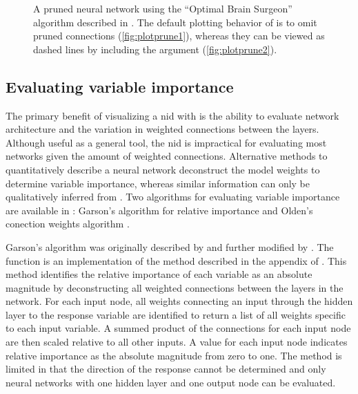 \documentclass[article,shortnames]{jss}\usepackage[]{graphicx}\usepackage[]{color}
\begin{document}
\begin{figure}[!ht]
{}

\caption{A pruned neural network using the ``Optimal Brain Surgeon'' algorithm described in \citet{Zell98}.  The default plotting behavior of  is to omit pruned connections (\ref{fig:plotprune1}), whereas they can be viewed as dashed lines by including the  argument (\ref{fig:plotprune2}).}\label{fig:plotprune}
\end{figure}



\subsection{Evaluating variable importance}

The primary benefit of visualizing a \ac{nid} with  is the ability to evaluate network architecture and the variation in weighted connections between the layers.  Although useful as a general tool, the \ac{nid} is impractical for evaluating most networks given the amount of weighted connections.  Alternative methods to quantitatively describe a neural network deconstruct the model weights to determine variable importance, whereas similar information can only be qualitatively inferred from .  Two algorithms for evaluating variable importance are available in : Garson's algorithm for relative importance \citep{Garson91,Goh95} and Olden's conection weights algorithm \citep{Olden04}.

Garson's algorithm was originally described by \citet{Garson91} and further modified by \citet{Goh95}.  The  function is an implementation of the method described in the appendix of \citet{Goh95}.  This method identifies the relative importance of each variable as an absolute magnitude by deconstructing all weighted connections between the layers in the network. For each input node, all weights connecting an input through the hidden layer to the response variable are identified to return a list of all weights specific to each input variable. A summed product of the connections for each input node are then scaled relative to all other inputs. A value for each input node indicates relative importance as the absolute magnitude from zero to one. The method is limited in that the direction of the response cannot be determined and only neural networks with one hidden layer and one output node can be evaluated.
\end{document}
